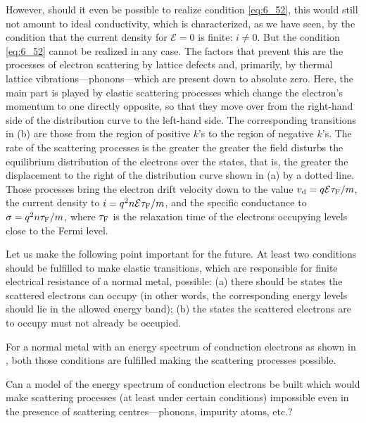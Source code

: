 However, should it even be possible to realize condition \eqref{eq:6_52}, this would still not amount to ideal conductivity, which is characterized, as we have seen, by the condition that the current density for $\mathcal{E}=0$ is finite: $i\neq 0$. But the condition \eqref{eq:6_52} cannot be realized in any case. The factors that prevent this are the processes of electron scattering by lattice defects and, primarily, by thermal lattice vibrations---phonons---which are present down to absolute zero. Here, the main part is played by elastic scattering processes which change the electron's momentum to one directly opposite, so that they move over from the right-hand side of the distribution curve to the left-hand side. The corresponding transitions in (b) are those from the region of positive $k$'s to the region of negative $k$'s. The rate of the scattering processes is the greater the greater the field disturbs the equilibrium distribution of the electrons over the states, that is, the greater the displacement to the right of the distribution curve shown in (a) by a dotted line. Those processes bring the electron drift velocity down to the value $v_{\text{d}}=q\mathcal{E}\tau_{\text{F}}/m$, the current density to $i=q^2n\mathcal{E}\tau_{\text{F}}/m$, and the specific conductance to $\sigma=q^2n\tau_{\text{F}}/m$, where $\tau_{\text{F}}$ is the relaxation time of the electrons occupying levels close to the Fermi level.

Let us make the following point important for the future. At least two conditions should be fulfilled to make elastic transitions, which are responsible for finite electrical resistance of a normal metal, possible: (a) there should be states the scattered electrons can occupy (in other words, the corresponding energy levels should lie in the allowed energy band); (b) the states the scattered electrons are to occupy must not already be occupied.

For a normal metal with an energy spectrum of conduction electrons as shown in , both those conditions are fulfilled making the scattering processes possible.

Can a model of the energy spectrum of conduction electrons be built which would make scattering processes (at least under certain conditions) impossible even in the presence of scattering centres---phonons, impurity atoms, etc.?

